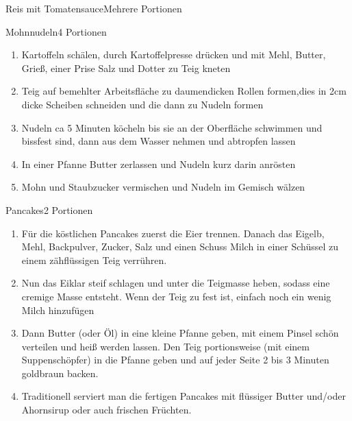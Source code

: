 \documentclass{article}
\begin{document}
\begin{recipe}{Reis mit Tomatensauce}{Mehrere Portionen}

\end{recipe}
\begin{recipe}{Mohnnudeln}{4 Portionen}{}



\begin{enumerate}
\item Kartoffeln schälen, durch Kartoffelpresse drücken und mit Mehl, Butter, Grieß, einer Prise Salz und Dotter zu Teig kneten
\item Teig auf bemehlter Arbeitsfläche zu daumendicken Rollen formen,dies in 2cm dicke Scheiben schneiden und die dann zu Nudeln formen
\item Nudeln ca 5 Minuten köcheln bis sie an der Oberfläche schwimmen und bissfest sind, dann aus dem Wasser nehmen und abtropfen lassen
\item In einer Pfanne Butter zerlassen und Nudeln kurz darin anrösten
\item Mohn und Staubzucker vermischen und Nudeln im Gemisch wälzen 
\end{enumerate}
\end{recipe}

\begin{recipe}{Pancakes}{2 Portionen}{}




\begin{enumerate}
\item Für die köstlichen Pancakes zuerst die Eier trennen. Danach das Eigelb, Mehl, Backpulver, Zucker, Salz und einen Schuss Milch in einer Schüssel zu einem zähflüssigen Teig verrühren.
\item Nun das Eiklar steif schlagen und unter die Teigmasse heben, sodass eine cremige Masse entsteht. Wenn der Teig zu fest ist, einfach noch ein wenig Milch hinzufügen
\item Dann Butter (oder Öl) in eine kleine Pfanne geben, mit einem Pinsel schön verteilen und heiß werden lassen. Den Teig portionsweise (mit einem Suppenschöpfer) in die Pfanne geben und auf jeder Seite 2 bis 3 Minuten goldbraun backen.
\item Traditionell serviert man die fertigen Pancakes mit flüssiger Butter und/oder Ahornsirup oder auch frischen Früchten.
\end{enumerate}
\end{recipe}
\end{document}
